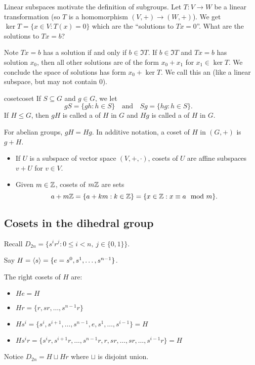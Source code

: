 \documentclass[12pt,letterpaper]{report}
\begin{document}
Linear subspaces motivate the definition of subgroups.
Let $T \colon V \to W$ be a linear transformation (so $T$ is a homomorphism $(V, +) \to (W, +)$).
We get $\ker T = \{x \in V : T(x) = 0\}$ which are the ``solutions to $Tx = 0$''.
What are the solutions to $Tx = b$?

Note $Tx = b$ has a solution if and only if $b \in \Im T$.
If $b \in \Im T$ and $Tx = b$ has solution $x_0$, then all other solutions are of the form
$x_0 + x_1$ for $x_1 \in \ker T$.
We conclude the space of solutions has form $x_0 + \ker T$.
We call this an  (like a linear subspace, but may not contain 0).

\begin{defn}{coset}{coset}
  If $S \subseteq G$ and $g \in G$, we let
  \[ gS = \{gh : h \in S\} \quad \text{and} \quad Sg = \{hg : h \in S\}. \]
  If $H \leq G$, then $gH$ is called a  of $H$ in $G$ and $Hg$ is called a
   of $H$ in $G$.
\end{defn}

For abelian groups, $gH = Hg$.
In additive notation, a coset of $H$ in $(G, +)$ is $g + H$.

\begin{ex}
  \begin{itemize}
    \item
    If $U$ is a subspace of vector space $(V, +, \cdot)$, cosets of $U$ are affine subspaces
    $v + U$ for $v \in V$.
    \item
    Given $m \in \mathbb{Z}$, cosets of $m\mathbb{Z}$ are sets
    \[
      a + m\mathbb{Z} = \{a + km : k \in \mathbb{Z}\} = \{x \in \mathbb{Z} : x \equiv a \mod{m}\}.
    \]
  \end{itemize}
\end{ex}

\pagebreak
\subsection{Cosets in the dihedral group}

Recall $D_{2n} = \{s^i r^j : 0 \leq i < n, \ j \in \{0, 1\}\}$.

Say $H = \langle s\rangle = \{e = s^0, s^1, \ldots, s^{n - 1}\}$.

The right cosets of $H$ are:
\begin{itemize}
  \item $He = H$
  \item $Hr = \{r, sr, \ldots, s^{n - 1}r\}$
  \item $Hs^i = \{s^i, s^{i + 1}, \ldots, s^{n - 1}, e, s^1, \ldots, s^{i - 1}\} = H$
  \item $Hs^i r = \{s^i r, s^{i + 1}r, \ldots, s^{n - 1}r, r, sr, \ldots, sr, \ldots, s^{i - 1}r\}
    = H$
\end{itemize}
Notice $D_{2n} = H \sqcup Hr$ where $\sqcup$ is disjoint union.
\end{document}
